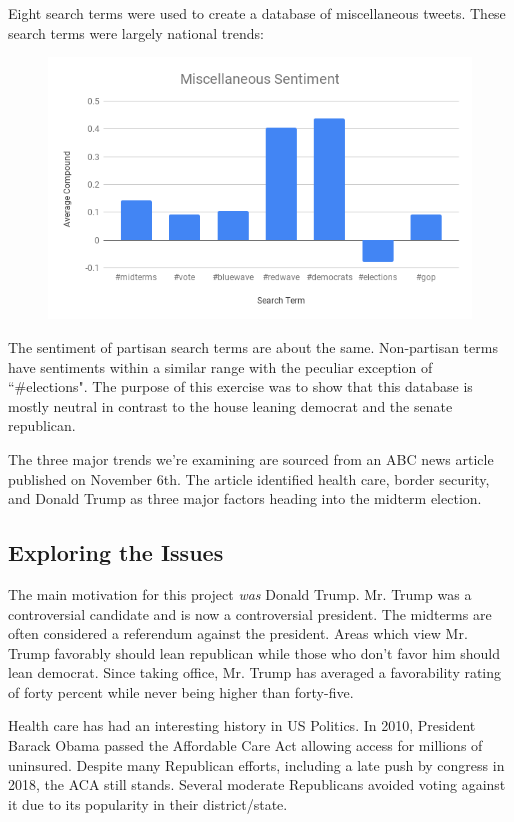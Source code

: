 \documentclass[11pt, twoside, reqno]{article}
\begin{document}
Eight search terms were used to create a database of miscellaneous tweets. These search terms were largely national trends:

\begin{figure}[H]
	\includegraphics[scale=0.5]{misc_sent}
\end{figure}

The sentiment of partisan search terms are about the same. Non-partisan terms have sentiments within a similar range with the peculiar exception of ``\#elections". The purpose of this exercise was to show that this database is mostly neutral in contrast to the house leaning democrat and the senate republican. 

The three major trends we're examining are sourced from an ABC news article published on November 6th. The article identified health care, border security, and Donald Trump as three major factors heading into the midterm election.

\subsection{Exploring the Issues}
\label{subsec:exploring the issues}
\hspace{0.2in}The main motivation for this project \textit{was} Donald Trump. Mr. Trump was a controversial candidate and is now a controversial president. The midterms are often considered a referendum against the president. Areas which view Mr. Trump favorably should lean republican while those who don't favor him should lean democrat. Since taking office, Mr. Trump has averaged a favorability rating of forty percent while never being higher than forty-five. 

Health care has had an interesting history in US Politics. In 2010, President Barack Obama passed the Affordable Care Act allowing access for millions of uninsured. Despite many Republican efforts, including a late push by congress in 2018, the ACA still stands. Several moderate Republicans avoided voting against it due to its popularity in their district/state. 
\end{document}
